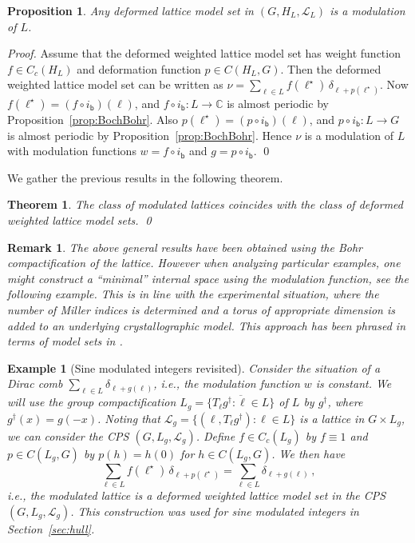 \documentclass[11pt, a4wide]{amsart}
\newcommand{\cL}{\mathcal L}
\newtheorem{theorem}[lemma]{Theorem}
\newtheorem{proposition}[lemma]{Proposition}
\newtheorem{example}[lemma]{Example}
\newtheorem{remark}[lemma]{Remark}
\numberwithin{lemma}{section}
\begin{document}
\begin{proposition}
Any deformed lattice model set in $(G, H_L, \mathcal L_L)$  is a modulation of $L$.
\end{proposition}


\begin{proof}
Assume that the deformed weighted lattice model set has weight function $f\in C_c(H_L)$ and deformation function $p \in C(H_L, G)$. Then the deformed weighted lattice model set can be written as $\nu=\sum_{\ell\in L} f(\ell^\star)\,\delta_{\ell+p(\ell^\star)}$.  Now $f(\ell^\star)=(f\circ i_\mathsf{b})(\ell)$, and $f\circ i_\mathsf{b}: L\to \mathbb C$ is almost periodic by Proposition~\ref{prop:BochBohr}. Also $p(\ell^\star)=(p\circ i_\mathsf{b})(\ell)$, and $p\circ i_\mathsf{b}: L\to G$ is almost periodic by Proposition~\ref{prop:BochBohr}.
Hence $\nu$ is a modulation of $L$ with modulation functions   $w=f\circ i_\mathsf{b}$ and  $g=p\circ i_\mathsf{b}$.
\qed
\end{proof}

We gather the previous results in the following theorem.

\begin{theorem}
The class of modulated lattices coincides with the class of deformed weighted lattice model sets. \qed
\end{theorem}

\medskip

\begin{remark}The above general results have been obtained using the Bohr compactification of the lattice. However when analyzing particular examples, one might construct a ``minimal'' internal space using the modulation function, see the following example. This is in line with the experimental situation, where the number of Miller indices is determined and a torus of appropriate dimension is added to an underlying crystallographic model. This approach has been phrased in terms of model sets in \cite[Sec.~3]{S08}.
\end{remark}

\begin{example}[Sine modulated integers revisited]
Consider the situation of a Dirac comb $\sum_{\ell\in L} \delta_{\ell+g(\ell)}$, i.e., the modulation function $w$ is constant. We will use the group compactification $L_g=\overline{\{T_\ell g^\dag: \ell\in L\}}$ of $L$ by $g^\dag$, where $g^\dag(x)=g(-x)$. Noting that  $\mathcal L_g=\{(\ell, T_\ell g^\dag): \ell\in L\}$ is a lattice in $G\times L_g$, we can consider the CPS $(G,L_g,\mathcal L_g)$. 
Define $f\in C_c(L_g)$ by $f\equiv 1$ and  $p\in C(L_g,G)$ by $p(h)=h(0)$ for $h\in C(L_g,G)$. We then have
%
\begin{displaymath}
\sum_{\ell\in L} f(\ell^\star) \, \delta_{\ell+p(\ell^\star)}=\sum_{\ell\in L} \delta_{\ell+g(\ell)}\, ,
\end{displaymath}
%
i.e., the modulated lattice is a deformed weighted lattice model set in the CPS $(G,L_g, \cL_g)$.
This construction was used for sine modulated integers in Section~\ref{sec:hull}.
\end{example}
\end{document}
